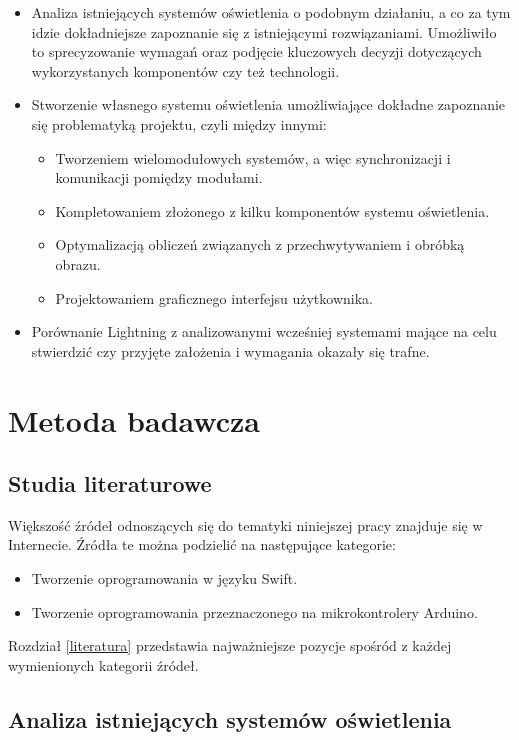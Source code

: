 \documentclass[12pt]{report}
\begin{document}
\begin{itemize}
	\item Analiza istniejących systemów oświetlenia o podobnym działaniu, a co za tym idzie dokładniejsze zapoznanie się z istniejącymi rozwiązaniami. Umożliwiło to sprecyzowanie wymagań oraz podjęcie kluczowych decyzji do\-tyczą\-cych wykorzystanych komponentów czy też technologii.
	\item Stworzenie własnego systemu oświetlenia umożliwiające dokładne zapoznanie się problematyką projektu, czyli między innymi:
	\begin{itemize}
		\item Tworzeniem wielomodułowych systemów, a więc synchronizacji i komunikacji pomiędzy modułami.
		\item Kompletowaniem złożonego z kilku komponentów systemu oświetlenia.
		\item Optymalizacją obliczeń związanych z przechwytywaniem i obróbką obrazu.
		\item Projektowaniem graficznego interfejsu użytkownika.
	\end{itemize}
	\item Porównanie Lightning z analizowanymi wcześniej systemami mające na celu stwierdzić czy przyjęte założenia i wymagania okazały się trafne.
\end{itemize}

\section{Metoda badawcza}

\subsection{Studia literaturowe}

Większość źródeł odnoszących się do tematyki niniejszej pracy znajduje się w Internecie. Źródła te można podzielić na następujące kategorie:

\begin{itemize}
	\item Tworzenie oprogramowania w języku Swift.
	\item Tworzenie oprogramowania przeznaczonego na mikrokontrolery Arduino.
\end{itemize}

Rozdział  \ref{literatura} przedstawia najważniejsze pozycje spośród z każdej wymienionych kategorii źródeł.

\subsection{Analiza istniejących systemów oświetlenia}
\end{document}
